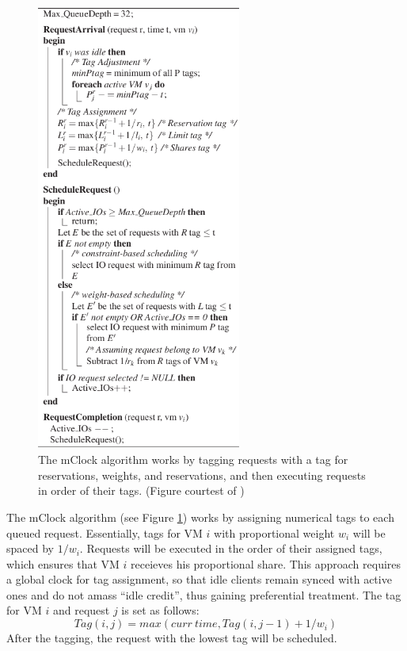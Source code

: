 \documentclass[letterpaper, twocolumn]{article}
\begin{document}
\begin{figure}[ht!]
		\includegraphics[width=2.65in]{images/mclock.png}
	\caption{The mClock algorithm works by tagging requests with a tag for
		reservations, weights, and reservations, and then executing requests
		in order of their tags.  (Figure courtest of \cite{ref:mclock})}
	\label{fig:mclock-alg}
\end{figure}

The mClock algorithm (see Figure \ref{fig:mclock-alg}) works by assigning numerical tags to each
queued request.  Essentially, tags for VM $i$ with proportional weight $w_i$ will be spaced by $1/w_i$.
Requests will be executed in the order of their assigned tags, which ensures that
VM $i$ receieves his proportional share.  This approach requires a global clock
for tag assignment, so that idle clients remain synced with active ones and do not
amass ``idle credit'', thus gaining preferential treatment.  The tag for VM $i$ and
request $j$ is set as follows:
\[
	Tag(i, j) = max(curr~time, Tag(i, j-1) + 1/w_i)
\]
After the tagging, the request with the lowest tag will be scheduled.
\end{document}
